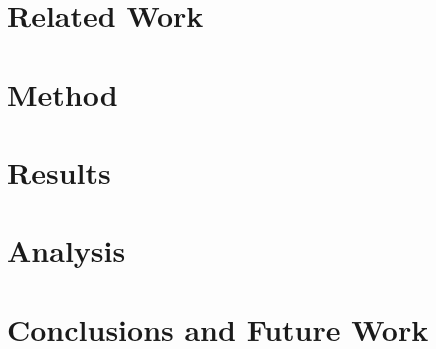 \documentclass[a4paper,oneside]{bth}
\begin{document}
\chapter{Related Work}


\chapter{Method}


\chapter{Results}


\chapter{Analysis}


\chapter{Conclusions and Future Work}



\nocite{*}

\end{document}
